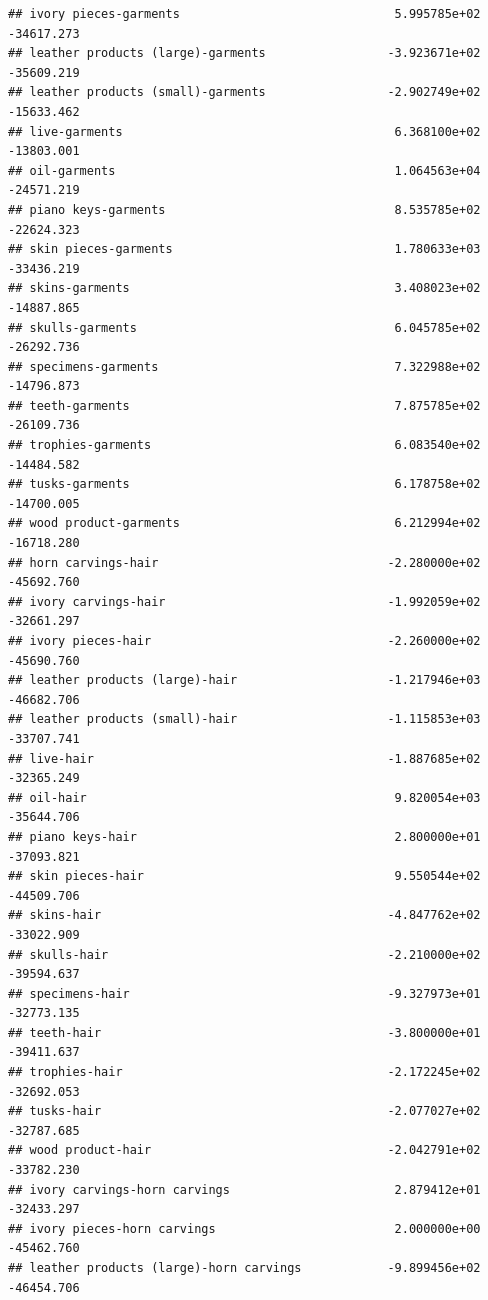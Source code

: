 \documentclass[
  12pt,
]{article}
\begin{document}
\begin{verbatim}
## ivory pieces-garments                              5.995785e+02  -34617.273
## leather products (large)-garments                 -3.923671e+02  -35609.219
## leather products (small)-garments                 -2.902749e+02  -15633.462
## live-garments                                      6.368100e+02  -13803.001
## oil-garments                                       1.064563e+04  -24571.219
## piano keys-garments                                8.535785e+02  -22624.323
## skin pieces-garments                               1.780633e+03  -33436.219
## skins-garments                                     3.408023e+02  -14887.865
## skulls-garments                                    6.045785e+02  -26292.736
## specimens-garments                                 7.322988e+02  -14796.873
## teeth-garments                                     7.875785e+02  -26109.736
## trophies-garments                                  6.083540e+02  -14484.582
## tusks-garments                                     6.178758e+02  -14700.005
## wood product-garments                              6.212994e+02  -16718.280
## horn carvings-hair                                -2.280000e+02  -45692.760
## ivory carvings-hair                               -1.992059e+02  -32661.297
## ivory pieces-hair                                 -2.260000e+02  -45690.760
## leather products (large)-hair                     -1.217946e+03  -46682.706
## leather products (small)-hair                     -1.115853e+03  -33707.741
## live-hair                                         -1.887685e+02  -32365.249
## oil-hair                                           9.820054e+03  -35644.706
## piano keys-hair                                    2.800000e+01  -37093.821
## skin pieces-hair                                   9.550544e+02  -44509.706
## skins-hair                                        -4.847762e+02  -33022.909
## skulls-hair                                       -2.210000e+02  -39594.637
## specimens-hair                                    -9.327973e+01  -32773.135
## teeth-hair                                        -3.800000e+01  -39411.637
## trophies-hair                                     -2.172245e+02  -32692.053
## tusks-hair                                        -2.077027e+02  -32787.685
## wood product-hair                                 -2.042791e+02  -33782.230
## ivory carvings-horn carvings                       2.879412e+01  -32433.297
## ivory pieces-horn carvings                         2.000000e+00  -45462.760
## leather products (large)-horn carvings            -9.899456e+02  -46454.706

\end{verbatim}
\end{document}

